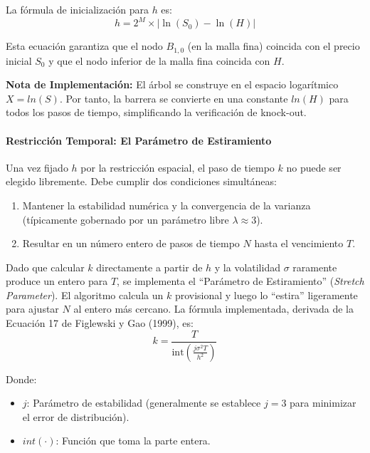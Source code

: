 La fórmula de inicialización para $h$ es: 
\begin{equation} 
  h = 2^M \times | \ln(S_0) - \ln(H) | \label{eq:amm_h_calib} 
\end{equation}

Esta ecuación garantiza que el nodo $B_{1,0}$ (en la malla fina) coincida con el precio inicial $S_0$ y que el nodo inferior de la malla fina coincida con $H$.

\textbf{Nota de Implementación:} El árbol se construye en el espacio logarítmico $X=ln(S)$. Por tanto, la barrera se convierte en una constante $ln(H)$ para todos los pasos de tiempo, simplificando la verificación de knock-out.

\paragraph{Restricción Temporal: El Parámetro de Estiramiento} 

Una vez fijado $h$ por la restricción espacial, el paso de tiempo $k$ no puede ser elegido libremente. Debe cumplir dos condiciones simultáneas:
\begin{enumerate} 
  \item Mantener la estabilidad numérica y la convergencia de la varianza (típicamente gobernado por un parámetro libre $\lambda\approx3$).
  
  \item Resultar en un número entero de pasos de tiempo $N$ hasta el vencimiento $T$.
\end{enumerate}

Dado que calcular $k$ directamente a partir de $h$ y la volatilidad $\sigma$ raramente produce un entero para $T$, se implementa el ``Parámetro de Estiramiento'' (\textit{Stretch Parameter}). El algoritmo calcula un $k$ provisional y luego lo ``estira'' ligeramente para ajustar $N$ al entero más cercano.
La fórmula implementada, derivada de la Ecuación 17 de Figlewski y Gao (1999), es:
\begin{equation} 
  k = \frac{T}{\text{int}\left( \frac{j \sigma^2 T}{h^2} \right)} \label{eq:amm_k_stretch} 
\end{equation}

Donde: 
\begin{itemize} 
  \item $j$: Parámetro de estabilidad (generalmente se establece $j=3$ para minimizar el error de distribución). 
  
  \item $int(\cdot)$: Función que toma la parte entera. 
\end{itemize}

